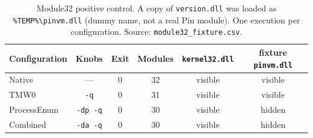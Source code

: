 
\begin{table}[!t]
\centering
\caption{Module32 positive control. A copy of \texttt{version.dll} was loaded as \texttt{\%TEMP\%\textbackslash pinvm.dll} (dummy name, not a real Pin module). One execution per configuration. Source: \texttt{module32\_fixture.csv}.}
\label{tab:module32_fixture}
\begin{tabular}{lccccc}
\hline
Configuration & Knobs & Exit & Modules & \texttt{kernel32.dll} & fixture \texttt{pinvm.dll} \\
\hline
Native & --- & 0 & 32 & visible & visible \\
TMW0 & \texttt{-q} & 0 & 31 & visible & visible \\
ProcessEnum & \texttt{-dp -q} & 0 & 30 & visible & hidden \\
Combined & \texttt{-da -q} & 0 & 30 & visible & hidden \\
\hline
\end{tabular}
\end{table}


